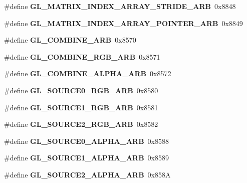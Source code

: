 \begin{DoxyCompactItemize}
\item 
\#define {\bfseries G\+L\+\_\+\+M\+A\+T\+R\+I\+X\+\_\+\+I\+N\+D\+E\+X\+\_\+\+A\+R\+R\+A\+Y\+\_\+\+S\+T\+R\+I\+D\+E\+\_\+\+A\+R\+B}~0x8848\label{_s_d_l__opengl_8h_a67e5345cb2e35088d0f12bf7ac7cda92}

\item 
\#define {\bfseries G\+L\+\_\+\+M\+A\+T\+R\+I\+X\+\_\+\+I\+N\+D\+E\+X\+\_\+\+A\+R\+R\+A\+Y\+\_\+\+P\+O\+I\+N\+T\+E\+R\+\_\+\+A\+R\+B}~0x8849\label{_s_d_l__opengl_8h_aff9e8093cdf852c0550e31395b41384c}

\item 
\#define {\bfseries G\+L\+\_\+\+C\+O\+M\+B\+I\+N\+E\+\_\+\+A\+R\+B}~0x8570\label{_s_d_l__opengl_8h_ad4c9f43d7ec9962afff14de8e1e26c4c}

\item 
\#define {\bfseries G\+L\+\_\+\+C\+O\+M\+B\+I\+N\+E\+\_\+\+R\+G\+B\+\_\+\+A\+R\+B}~0x8571\label{_s_d_l__opengl_8h_a11e172d19176c9dbc4a654f3ed0661d3}

\item 
\#define {\bfseries G\+L\+\_\+\+C\+O\+M\+B\+I\+N\+E\+\_\+\+A\+L\+P\+H\+A\+\_\+\+A\+R\+B}~0x8572\label{_s_d_l__opengl_8h_a51cd6921cb69072baae5c5527da2c633}

\item 
\#define {\bfseries G\+L\+\_\+\+S\+O\+U\+R\+C\+E0\+\_\+\+R\+G\+B\+\_\+\+A\+R\+B}~0x8580\label{_s_d_l__opengl_8h_ad6f48350acc935580b15f972fc88058b}

\item 
\#define {\bfseries G\+L\+\_\+\+S\+O\+U\+R\+C\+E1\+\_\+\+R\+G\+B\+\_\+\+A\+R\+B}~0x8581\label{_s_d_l__opengl_8h_a21bcd24f8985d2f2a73acd7b1f5cda7f}

\item 
\#define {\bfseries G\+L\+\_\+\+S\+O\+U\+R\+C\+E2\+\_\+\+R\+G\+B\+\_\+\+A\+R\+B}~0x8582\label{_s_d_l__opengl_8h_a042d2781498f17131e6d5f217c49235c}

\item 
\#define {\bfseries G\+L\+\_\+\+S\+O\+U\+R\+C\+E0\+\_\+\+A\+L\+P\+H\+A\+\_\+\+A\+R\+B}~0x8588\label{_s_d_l__opengl_8h_a5381097cf8761a63fac7e0cd241dc694}

\item 
\#define {\bfseries G\+L\+\_\+\+S\+O\+U\+R\+C\+E1\+\_\+\+A\+L\+P\+H\+A\+\_\+\+A\+R\+B}~0x8589\label{_s_d_l__opengl_8h_a52d110c63decc7cbd5c2c73a2dc3e577}

\item 
\#define {\bfseries G\+L\+\_\+\+S\+O\+U\+R\+C\+E2\+\_\+\+A\+L\+P\+H\+A\+\_\+\+A\+R\+B}~0x858\+A\label{_s_d_l__opengl_8h_a76e177b9f5817fc8afc8ab993c59a58b}


\end{DoxyCompactItemize}
